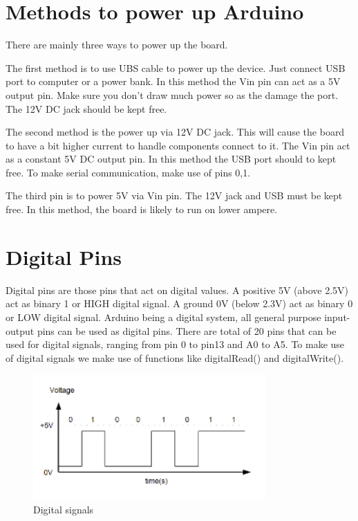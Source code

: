 \section{Methods to power up Arduino}
There are mainly three ways to power up the board. 
\par The first method is to use UBS cable to power up the device. Just connect USB port to computer or a power bank. In this method the Vin pin can act as a 5V output pin. Make sure you don’t draw much power so as the damage the port. The 12V DC jack should be kept free. 
\par The second method is the power up via 12V DC jack. This will cause the board to have a bit higher current to handle components connect to it. The Vin pin act as a constant 5V DC output pin. In this method the USB port should to kept free. To make serial communication, make use of pins 0,1. 
\par The third pin is to power 5V via Vin pin. The 12V jack and USB must be kept free. In this method, the board is likely to run on lower ampere.

\section{Digital Pins}
\par Digital pins are those pins that act on digital values. A positive 5V (above 2.5V) act as binary 1 or HIGH digital signal. A ground 0V (below 2.3V) act as binary 0 or LOW digital signal. Arduino being a digital system, all general purpose input-output pins can be used as digital pins. There are total of 20 pins that can be used for digital signals, ranging from pin 0 to pin13 and A0 to A5. To make use of digital signals we make use of functions like digitalRead() and digitalWrite().

\begin{figure}
 \centering
 \includegraphics[width=3.5in]{Images/Intro_Arduino/digital_graph.png}
 \caption{Digital signals}
\end{figure}

